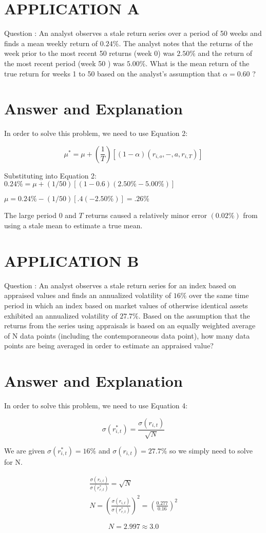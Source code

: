 \documentclass[11pt]{article}
\begin{document}
\section*{APPLICATION A}
Question : An analyst observes a stale return series over a period of 50 weeks and finds a mean weekly return of $0.24 \%$. The analyst notes that the returns of the week prior to the most recent 50 returns (week 0) was $2.50 \%$ and the return of the most recent period (week 50 ) was $5.00 \%$. What is the mean return of the true return for weeks 1 to 50 based on the analyst's assumption that $\alpha=0.60$ ?

\section*{Answer and Explanation}
In order to solve this problem, we need to use Equation 2:

$$
\mu^{*}=\mu+\left(\frac{1}{T}\right)\left[(1-\alpha)\left(r_{i, o},-, a, r_{i, T}\right)\right]
$$

Substituting into Equation 2:\\
$0.24 \%=\mu+(1 / 50)[(1-0.6)(2.50 \%-5.00 \%)]$

$\mu=0.24 \%-(1 / 50)[.4(-2.50 \%)]=.26 \%$

The large period 0 and $T$ returns caused a relatively minor error $(0.02 \%)$ from using a stale mean to estimate a true mean.

\section*{APPLICATION B}
Question : An analyst observes a stale return series for an index based on appraised values and finds an annualized volatility of $16 \%$ over the same time period in which an index based on market values of otherwise identical assets exhibited an annualized volatility of $27.7 \%$. Based on the assumption that the returns from the series using appraisals is based on an equally weighted average of $\mathrm{N}$ data points (including the contemporaneous data point), how many data points are being averaged in order to estimate an appraised value?

\section*{Answer and Explanation}
In order to solve this problem, we need to use Equation 4:

$$
\sigma\left(r_{i, t}^{*}\right)=\frac{\sigma\left(r_{i, t}\right)}{\sqrt{N}}
$$

We are given $\sigma\left(r_{i, t}^{*}\right)=16 \%$ and $\sigma\left(r_{i, t}\right)=27.7 \%$ so we simply need to solve for $\mathrm{N}$.

$$
\begin{gathered}
\frac{\sigma\left(r_{i, t}\right)}{\sigma\left(r_{r, t}^{*}\right)}=\sqrt{N} \\
N=\left(\frac{\sigma\left(r_{i, t}\right)}{\sigma\left(r_{r, t}^{*}\right)}\right)^{2}=\left(\frac{0.277}{0.16}\right)^{2}
\end{gathered}
$$

$$
N=2.997 \approx 3.0
$$
\end{document}
